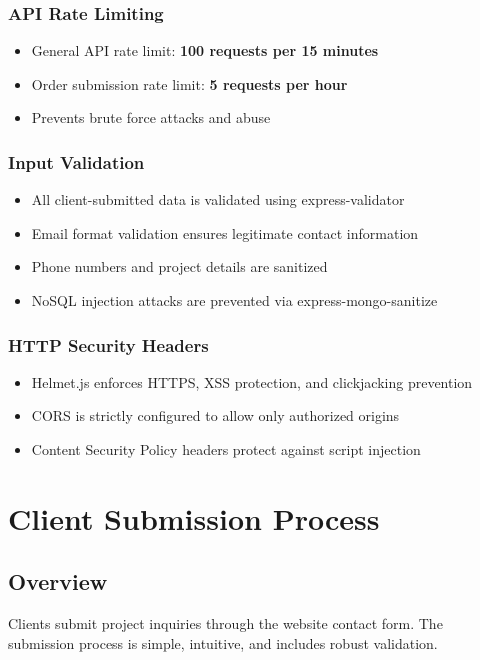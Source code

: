 \documentclass[12pt]{article}
\begin{document}
\subsubsection{API Rate Limiting}
\begin{itemize}
  \item General API rate limit: \textbf{100 requests per 15 minutes}
  \item Order submission rate limit: \textbf{5 requests per hour}
  \item Prevents brute force attacks and abuse
\end{itemize}

\subsubsection{Input Validation}
\begin{itemize}
  \item All client-submitted data is validated using express-validator
  \item Email format validation ensures legitimate contact information
  \item Phone numbers and project details are sanitized
  \item NoSQL injection attacks are prevented via express-mongo-sanitize
\end{itemize}

\subsubsection{HTTP Security Headers}
\begin{itemize}
  \item Helmet.js enforces HTTPS, XSS protection, and clickjacking prevention
  \item CORS is strictly configured to allow only authorized origins
  \item Content Security Policy headers protect against script injection
\end{itemize}

\section{Client Submission Process}

\subsection{Overview}

Clients submit project inquiries through the website contact form. The submission process is simple, intuitive, and includes robust validation.
\end{document}
